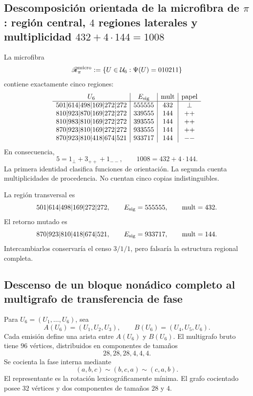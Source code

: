 \subsection{Descomposición orientada de la microfibra de \texorpdfstring{\(\pi\)}{pi}: región central, \(4\) regiones laterales y multiplicidad \texorpdfstring{\(432+4\cdot144=1008\)}{432+4x144=1008}}

La microfibra
\[
 \mathscr R_\pi^{\rm micro}
 :=\{U\in\mathcal U_6:\Psi(U)=010211\}
\]
contiene exactamente cinco regiones:
\[
\begin{array}{c|c|c|c}
U_6&E_{\rm sig}&\operatorname{mult}&\text{papel}\\ \hline
501|614|498|169|272|272&555555&432&\perp\\
810|923|870|169|272|272&339555&144&++\\
810|983|810|169|272|272&393555&144&++\\
870|923|810|169|272|272&933555&144&++\\
870|923|810|418|674|521&933717&144&--
\end{array}
\]
En consecuencia,
\begin{equation}
 \boxed{
 5=1_\perp+3_{++}+1_{--},
 \qquad
 1008=432+4\cdot144.}
 \label{p12-83-c9-s1:eq:descomposiciones-cinco-regiones-pi}
\end{equation}
La primera identidad clasifica funciones de orientación. La segunda cuenta
multiplicidades de procedencia. No cuentan cinco copias indistinguibles.

La región transversal es
\[
 501|614|498|169|272|272,
 \qquad E_{\rm sig}=555555,
 \qquad\operatorname{mult}=432.
\]
El retorno mutado es
\[
 870|923|810|418|674|521,
 \qquad E_{\rm sig}=933717,
 \qquad\operatorname{mult}=144.
\]
Intercambiarlos conservaría el censo \(3/1/1\), pero falsaría la estructura
regional completa.

\subsection{Descenso de un bloque nonádico completo al multigrafo de transferencia de fase}

Para \(U_6=(U_1,\ldots,U_6)\), sea
\[
 A(U_6)=(U_1,U_2,U_3),
 \qquad
 B(U_6)=(U_4,U_5,U_6).
\]
Cada emisión define una arista entre \(A(U_6)\) y \(B(U_6)\). El multigrafo
bruto tiene \(96\) vértices, distribuidos en componentes de tamaños
\[
 28,28,28,4,4,4.
\]
Se cocienta la fase interna mediante
\[
 (a,b,c)\sim(b,c,a)\sim(c,a,b).
\]
El representante es la rotación lexicográficamente mínima. El grafo
cocientado posee \(32\) vértices y dos componentes de tamaños \(28\) y \(4\).


